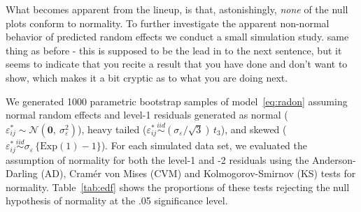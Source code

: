 \documentclass[12pt]{article} %
\newcommand{\hh}[1]{{\color{orange} #1}}
\newcommand{\al}[1]{{\color{red} #1}}
\begin{document}
What becomes apparent from the lineup, is that, astonishingly, {\it none} of the null plots conform to normality. \al{To further investigate the apparent non-normal behavior of predicted random effects we conduct a small simulation study.}
\hh{same thing as before - this is supposed to be the lead in to the next sentence, but it seems to indicate that you recite a result that you have done and don't want to show, which makes it a bit cryptic as to what you are doing next.}




We generated 1000 parametric bootstrap samples of model~\eqref{eq:radon} assuming normal random effects and level-1 residuals generated as normal ($\varepsilon_{ij}^* \sim \mathcal{N}(\bm{0},\ \sigma^2_\varepsilon)$), heavy tailed ($\varepsilon_{ij}^* \overset{iid}{\sim} (\sigma_{\varepsilon} / \sqrt{3})\, t_3$), and skewed ($\varepsilon_{ij}^* \overset{iid}{\sim} \sigma_{\varepsilon} \, \{ \text{Exp}(1) - 1 \}$).
For each simulated data set, we evaluated the assumption of normality for both the level-1 and -2 residuals using the Anderson-Darling (AD), Cram{\'e}r von Mises (CVM) and  Kolmogorov-Smirnov (KS) tests for normality.  
Table~\ref{tab:edf} shows the proportions of these tests rejecting the null hypothesis of normality at the .05 significance level. 
\end{document}
